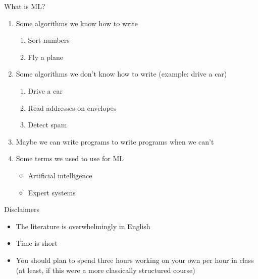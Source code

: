 What is ML?
\begin{enumerate}
\item Some algorithms we know how to write
  \begin{enumerate}
  \item Sort numbers
  \item Fly a plane
  \end{enumerate}
\item Some algorithms we don't know how to write (example: drive a car)
  \begin{enumerate}
  \item Drive a car 
  \item Read addresses on envelopes
  \item Detect spam
  \end{enumerate}
\item Maybe we can write programs to write programs when we can't
\item Some terms we used to use for ML
  \begin{itemize}
  \item Artificial intelligence
  \item Expert systems
  \end{itemize}
\end{enumerate}

Disclaimers
\begin{itemize}
\item The literature is overwhelmingly in English
\item Time is short
\item You should plan to spend three hours working on your own per hour in class (at least, if this were a more classically structured course)
\end{itemize}

